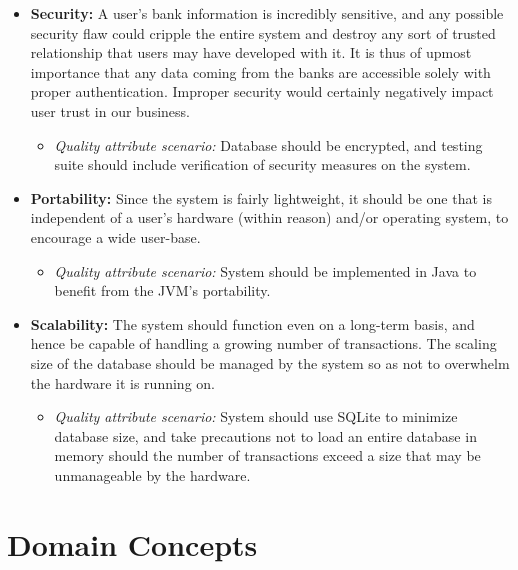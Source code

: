 \begin{itemize}
\begin{itemize}
        \end{itemize}
    \item \textbf{Security:} A user's bank information is incredibly sensitive, and any possible security flaw could cripple the entire system and destroy any sort of trusted relationship that users may have developed with it. It is thus of upmost importance that any data coming from the banks are accessible solely with proper authentication. Improper security would certainly negatively impact user trust in our business.
        \begin{itemize}
            \item \textit{Quality attribute scenario:} Database should be encrypted, and testing suite should include verification of security measures on the system.
        \end{itemize}
    \item \textbf{Portability:} Since the system is fairly lightweight, it should be one that is independent of a user's hardware (within reason) and/or operating system, to encourage a wide user-base.
        \begin{itemize}
            \item \textit{Quality attribute scenario:} System should be implemented in Java to benefit from the JVM's portability.
        \end{itemize}
    \item \textbf{Scalability:} The system should function even on a long-term basis, and hence be capable of handling a growing number of transactions. The scaling size of the database should be managed by the system so as not to overwhelm the hardware it is running on.
        \begin{itemize}
            \item \textit{Quality attribute scenario:} System should use SQLite to minimize database size, and take precautions not to load an entire database in memory should the number of transactions exceed a size that may be unmanageable by the hardware.
        \end{itemize}
\end{itemize}

\section{Domain Concepts}



